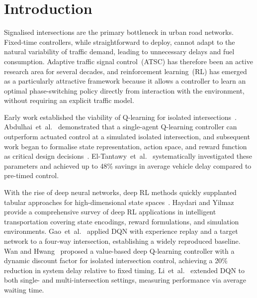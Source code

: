 \documentclass[conference]{IEEEtran}
\begin{document}
\section{Introduction}

Signalised intersections are the primary bottleneck in urban road
networks. Fixed-time controllers, while straightforward to deploy,
cannot adapt to the natural variability of traffic demand, leading
to unnecessary delays and fuel consumption. Adaptive traffic signal
control~(ATSC) has therefore been an active research area for
several decades, and reinforcement learning~(RL) has emerged as a
particularly attractive framework because it allows a controller to
learn an optimal phase-switching policy directly from interaction
with the environment, without requiring an explicit traffic model.

Early work established the viability of Q-learning for isolated
intersections~\cite{Abdulhai2003ReinforcementLFAD,
ElTantawy2010AnALV, A2011ReinforcementLWU}.
Abdulhai~et~al.~\cite{Abdulhai2003ReinforcementLFAD} demonstrated
that a single-agent Q-learning controller can outperform actuated
control at a simulated isolated intersection, and subsequent work
began to formalise state representation, action space, and reward
function as critical design
decisions~\cite{ElTantawy2014DesignORH, Touhbi2017AdaptiveTSM}.
El-Tantawy~et~al.~\cite{ElTantawy2014DesignORH} systematically
investigated these parameters and achieved up to 48\% savings in
average vehicle delay compared to pre-timed control.

With the rise of deep neural networks, deep RL methods quickly
supplanted tabular approaches for high-dimensional state
spaces~\cite{Haydari2020DeepRLC, Rasheed2020DeepRLBL}.
Haydari and Yilmaz~\cite{Haydari2020DeepRLC} provide a
comprehensive survey of deep RL applications in intelligent
transportation covering state encodings, reward formulations, and
simulation environments. Gao~et~al.~\cite{Gao2017AdaptiveTSA}
applied DQN with experience replay and a target network to a
four-way intersection, establishing a widely reproduced baseline.
Wan and Hwang~\cite{Wan2018ValuebasedDRE} proposed a value-based
deep Q-learning controller with a dynamic discount factor for
isolated intersection control, achieving a 20\% reduction in system
delay relative to fixed timing. Li~et~al.~\cite{Li2020AdaptiveTSN}
extended DQN to both single- and multi-intersection settings,
measuring performance via average waiting time.
\end{document}
